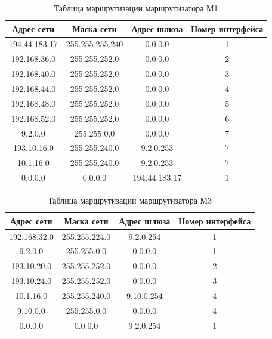 \documentclass[a4paper, 14pt]{extarticle}
\begin{document}
\begin{table}[H]
  \centering
  \setlength{\tabcolsep}{14pt}
  \caption{Таблица маршрутизации маршрутизатора М1}
  \begin{tabular}{|c|c|c|c|}
    \hline
    Адрес сети    & Маска сети      & Адрес шлюза   & Номер интерфейса \\
    \hline
    194.44.183.17 & 255.255.255.240 & 0.0.0.0       & 1                \\
    \hline
    192.168.36.0  & 255.255.252.0   & 0.0.0.0       & 2                \\
    \hline
    192.168.40.0  & 255.255.252.0   & 0.0.0.0       & 3                \\
    \hline
    192.168.44.0  & 255.255.252.0   & 0.0.0.0       & 4                \\
    \hline
    192.168.48.0  & 255.255.252.0   & 0.0.0.0       & 5                \\
    \hline
    192.168.52.0  & 255.255.252.0   & 0.0.0.0       & 6                \\
    \hline
    9.2.0.0       & 255.255.0.0     & 0.0.0.0       & 7                \\
    \hline
    193.10.16.0   & 255.255.240.0   & 9.2.0.253     & 7                \\
    \hline
    10.1.16.0     & 255.255.240.0   & 9.2.0.253     & 7                \\
    \hline
    0.0.0.0       & 0.0.0.0         & 194.44.183.17 & 1                \\
    \hline
  \end{tabular}
\end{table}

\begin{table}[H]
  \centering
  \setlength{\tabcolsep}{20pt}
  \caption{Таблица маршрутизации маршрутизатора М3}
  \begin{tabular}{|c|c|c|c|}
    \hline
    Адрес сети   & Маска сети    & Адрес шлюза & Номер интерфейса \\
    \hline
    192.168.32.0 & 255.255.224.0 & 9.2.0.254   & 1                \\
    \hline
    9.2.0.0      & 255.255.0.0   & 0.0.0.0     & 1                \\
    \hline
    193.10.20.0  & 255.255.252.0 & 0.0.0.0     & 2                \\
    \hline
    193.10.24.0  & 255.255.252.0 & 0.0.0.0     & 3                \\
    \hline
    10.1.16.0    & 255.255.240.0 & 9.10.0.254  & 4                \\
    \hline
    9.10.0.0     & 255.255.0.0   & 0.0.0.0     & 4                \\
    \hline
    0.0.0.0      & 0.0.0.0       & 9.2.0.254   & 1                \\
    \hline
  \end{tabular}
\end{table}
\end{document}
